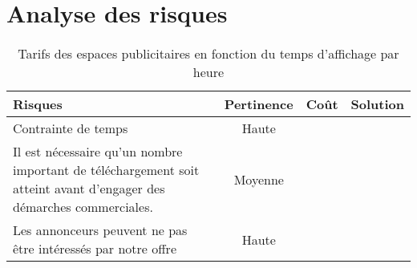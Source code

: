 	\chapter{Analyse des risques}
%
% 

  \begin{table}[H]
	  \centering
	  \begin{tabular}{|p{5.5cm}|c|c|p{6.5cm}|}
		  \hline
		  \textbf{Risques} & \textbf{Pertinence} & \textbf{Coût} & \textbf{Solution} \\
		  \hline
			Contrainte de temps &
			Haute & 
			&\\
		\hline
			Il est nécessaire qu'un nombre important de téléchargement soit atteint avant d'engager des démarches commerciales. &
			Moyenne & 
			&\\
		\hline
			Les annonceurs peuvent ne pas être intéressés par notre offre &
			Haute&
			&\\
		\hline

	  \end{tabular}
	  \caption{Tarifs des espaces publicitaires en fonction du temps d'affichage par heure}
	  \label{tab:risques}
  \end{table}
